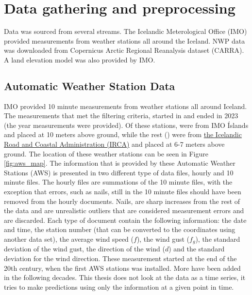 
\chapter{Data gathering and preprocessing} %

\label{Chapter2} %


Data was sourced from several streams. The Icelandic Meterological Office (IMO) provided measurements from weather stations all around the Iceland. NWP data was downloaded from Copernicus Arctic Regional Reanalysis dataset (CARRA). A land elevation model was also provided by IMO.

\section{Automatic Weather Station Data}

IMO provided 10 minute measurements from \nStationsMin weather stations all around Iceland. The measurements that met the filtering criteria, started in \startDateVedur and ended in 2023 (the year measurements were provided). Of these \nStationsMin stations, \nVedurMin were from IMO Íslands and placed at 10 meters above ground, while the rest (\nVGMin) were from \href{https://www.vegagerdin.is/}{the Icelandic Road and Coastal Administration (IRCA)} and placed at 6-7 meters above ground\cite{vegagerdin_postur}. The location of these weather stations can be seen in Figure \ref{fig:aws_map}. The information that is provided by these Automatic Weather Stations (AWS) is presented in two different type of data files, hourly and 10 minute files. The hourly files are summations of the 10 minute files, with the exception that errors, such as nails, still in the 10 minute files should have been removed from the hourly documents. Nails, are sharp increases from the rest of the data and are unrealistic outliers that are considered measurement errors and are discarded. Each type of document contain the following information: the date and time, the station number (that can be converted to the coordinates using another data set), the average wind speed ($f$), the wind gust ($f_g$), the standard deviation of the wind gust, the direction of the wind ($d$) and the standard deviation for the wind direction. These measurement started at the end of the 20th century, when the first AWS stations was installed. More have been added in the following decades. This thesis does not look at the data as a time series, it tries to make predictions using only the information at a given point in time.

